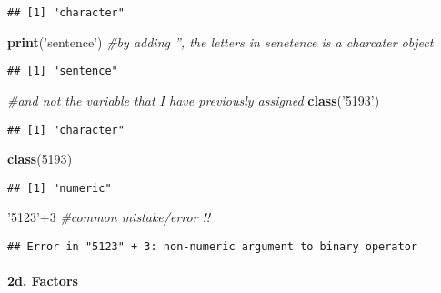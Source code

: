 \documentclass[]{article}
\newenvironment{Shaded}{\begin{snugshade}}{\end{snugshade}}
\newcommand{\KeywordTok}[1]{\textcolor[rgb]{0.13,0.29,0.53}{\textbf{{#1}}}}
\newcommand{\DecValTok}[1]{\textcolor[rgb]{0.00,0.00,0.81}{{#1}}}
\newcommand{\StringTok}[1]{\textcolor[rgb]{0.31,0.60,0.02}{{#1}}}
\newcommand{\CommentTok}[1]{\textcolor[rgb]{0.56,0.35,0.01}{\textit{{#1}}}}
\newcommand{\NormalTok}[1]{{#1}}
\let\oldparagraph\paragraph
\renewcommand{\paragraph}[1]{\oldparagraph{#1}\mbox{}}
\begin{document}
\begin{verbatim}
## [1] "character"
\end{verbatim}

\begin{Shaded}
\begin{Highlighting}[]
\KeywordTok{print}\NormalTok{(}\StringTok{'sentence'}\NormalTok{) }\CommentTok{#by adding '', the letters in senetence is a charcater object }
\end{Highlighting}
\end{Shaded}

\begin{verbatim}
## [1] "sentence"
\end{verbatim}

\begin{Shaded}
\begin{Highlighting}[]
\CommentTok{#and not the variable that I have previously assigned}
\KeywordTok{class}\NormalTok{(}\StringTok{'5193'}\NormalTok{) }
\end{Highlighting}
\end{Shaded}

\begin{verbatim}
## [1] "character"
\end{verbatim}

\begin{Shaded}
\begin{Highlighting}[]
\KeywordTok{class}\NormalTok{(}\DecValTok{5193}\NormalTok{)}
\end{Highlighting}
\end{Shaded}

\begin{verbatim}
## [1] "numeric"
\end{verbatim}

\begin{Shaded}
\begin{Highlighting}[]
\StringTok{'5123'}\NormalTok{+}\DecValTok{3} \CommentTok{#common mistake/error !!}
\end{Highlighting}
\end{Shaded}

\begin{verbatim}
## Error in "5123" + 3: non-numeric argument to binary operator
\end{verbatim}

\paragraph{2d. Factors}\label{d.-factors}
\end{document}
